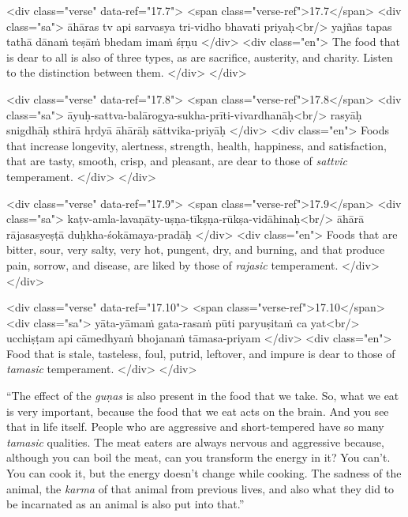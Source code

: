 \begin{html}
<div class="verse" data-ref="17.7">
  <span class="verse-ref">17.7</span>
  <div class="sa">
    āhāras tv api sarvasya tri-vidho bhavati priyaḥ<br/>
    yajñas tapas tathā dānaṁ teṣāṁ bhedam imaṁ śṛṇu
  </div>
  <div class="en">
    The food that is dear to all is also of three types, as are sacrifice, austerity, and charity. Listen to the distinction between them.
  </div>
</div>
\end{html}



\begin{html}
<div class="verse" data-ref="17.8">
  <span class="verse-ref">17.8</span>
  <div class="sa">
    āyuḥ-sattva-balārogya-sukha-prīti-vivardhanāḥ<br/>
    rasyāḥ snigdhāḥ sthirā hṛdyā āhārāḥ sāttvika-priyāḥ
  </div>
  <div class="en">
    Foods that increase longevity, alertness, strength, health, happiness, and satisfaction, that are tasty, smooth, crisp, and pleasant, are dear to those of \textit{sattvic} temperament.
  </div>
</div>
\end{html}



\begin{html}
<div class="verse" data-ref="17.9">
  <span class="verse-ref">17.9</span>
  <div class="sa">
    kaṭv-amla-lavaṇāty-uṣṇa-tīkṣṇa-rūkṣa-vidāhinaḥ<br/>
    āhārā rājasasyeṣṭā duḥkha-śokāmaya-pradāḥ
  </div>
  <div class="en">
    Foods that are bitter, sour, very salty, very hot, pungent, dry, and burning, and that produce pain, sorrow, and disease, are liked by those of \textit{rajasic} temperament.
  </div>
</div>
\end{html}



\begin{html}
<div class="verse" data-ref="17.10">
  <span class="verse-ref">17.10</span>
  <div class="sa">
    yāta-yāmaṁ gata-rasaṁ pūti paryuṣitaṁ ca yat<br/>
    ucchiṣṭam api cāmedhyaṁ bhojanaṁ tāmasa-priyam
  </div>
  <div class="en">
    Food that is stale, tasteless, foul, putrid, leftover, and impure is dear to those of \textit{tamasic} temperament.
  </div>
</div>
\end{html}


\enquote{The effect of the \textit{guṇas} is also present in the food that we take. So, what we eat is very important, because the food that we eat acts on the brain. And you see that in life itself. People who are aggressive and short-tempered have so many \textit{tamasic} qualities. The meat eaters are always nervous and aggressive because, although you can boil the meat, can you transform the energy in it? You can’t. You can cook it, but the energy doesn’t change while cooking. The sadness of the animal, the \textit{karma} of that animal from previous lives, and also what they did to be incarnated as an animal is also put into that.}


